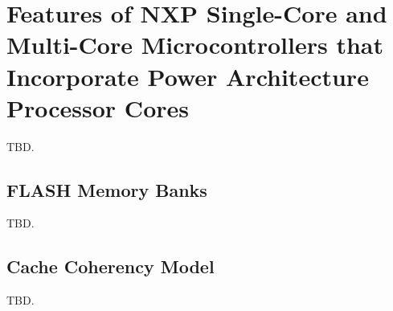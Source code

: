 \section{Features of NXP\textsuperscript{\textregistered} Single-Core and
         Multi-Core Microcontrollers that Incorporate
         Power Architecture\textsuperscript{\textregistered} Processor Cores}
\label{sndv0}

TBD.

\subsection{FLASH Memory Banks}
\label{sndv0:sfmb0}

TBD.


\subsection{Cache Coherency Model}
\label{sndv0:sccm0}

TBD.
